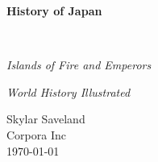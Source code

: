 \clearpage
\vspace*{1.5in}
\begin{center}
  \begin{minipage}{\textwidth}
    \centering
    \Huge\bfseries
    \linespread{1.25}\selectfont
  History of Japan
  \end{minipage}
  \\[3em]
  {\Large\itshape\linespread{1.3}\selectfont
  Islands of Fire and Emperors\par}
  \vspace{0.5em}
  {\large\itshape World History Illustrated\par}
  \vfill
  {\large Skylar Saveland}
  \\[1em]
  {\large Corpora Inc}
  \\[1em]
  {\large \today}
\end{center}
\clearpage
